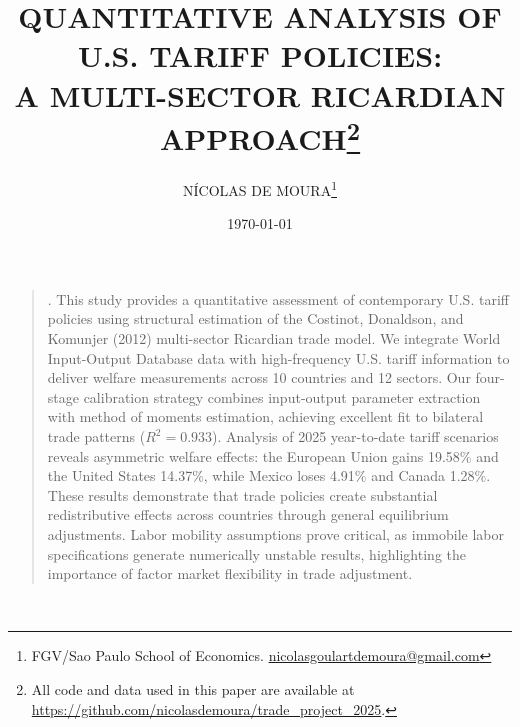 \documentclass[a4paper, 12pt]{article}
\renewenvironment{abstract}
{\small\begin{quote}\noindent \par{\sc \abstractname.}}
{\noindent\end{quote}}
\begin{document}
\title{\normalsize\MakeUppercase{\bfseries 
 Quantitative Analysis of U.S. Tariff Policies:\\A Multi-Sector Ricardian Approach}\footnote{All code and data used in this paper are available at \url{https://github.com/nicolasdemoura/trade_project_2025}.}}
\date{\footnotesize\MakeUppercase\today}
\author{
    \small\MakeUppercase{Nícolas de Moura}\footnote{FGV/Sao Paulo School of Economics. \href{mailto:nicolasgoulartdemoura@gmail.com}{nicolasgoulartdemoura@gmail.com}}
}
\maketitle

\begin{abstract}
This study provides a quantitative assessment of contemporary U.S. tariff policies using structural estimation of the Costinot, Donaldson, and Komunjer (2012) multi-sector Ricardian trade model. We integrate World Input-Output Database data with high-frequency U.S. tariff information to deliver welfare measurements across 10 countries and 12 sectors. Our four-stage calibration strategy combines input-output parameter extraction with method of moments estimation, achieving excellent fit to bilateral trade patterns ($R^2 = 0.933$). Analysis of 2025 year-to-date tariff scenarios reveals asymmetric welfare effects: the European Union gains 19.58\% and the United States 14.37\%, while Mexico loses 4.91\% and Canada 1.28\%. These results demonstrate that trade policies create substantial redistributive effects across countries through general equilibrium adjustments. Labor mobility assumptions prove critical, as immobile labor specifications generate numerically unstable results, highlighting the importance of factor market flexibility in trade adjustment.
\end{abstract}



\newpage
\
\newpage
\newpage


\newpage



\newpage



\end{document}

